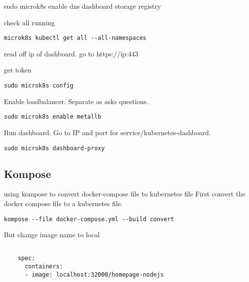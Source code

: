 sudo microk8s enable dns dashboard storage registry

check all running
\begin{verbatim}
microk8s kubectl get all --all-namespaces
\end{verbatim}
read off ip of dashboard. go to https://ip:443

get token
\begin{verbatim}
sudo microk8s config
\end{verbatim}

Enable loadbalancer. Separate as asks questions.

\begin{verbatim}
sudo microk8s enable metallb
\end{verbatim}

Run dashboard. Go to IP and port for service/kubernetes-dashboard.

\begin{verbatim}
sudo microk8s dashboard-proxy
\end{verbatim}



\subsection{Kompose}



using kompose to convert docker-compose file to kubernetes file
First convert the docker compose file to a kubernetes file.

\begin{verbatim}
kompose --file docker-compose.yml --build convert
\end{verbatim}

But change image name to local

\begin{verbatim}

    spec:
      containers:
      - image: localhost:32000/homepage-nodejs
\end{verbatim}

